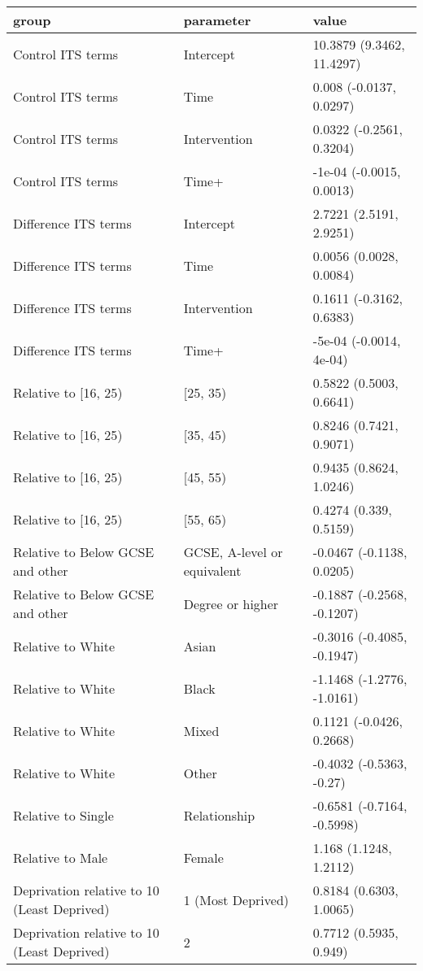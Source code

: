 \begin{table}[ht]
\centering
\begin{tabular}{lll}
  \hline
group & parameter & value \\ 
  \hline
Control ITS terms & Intercept & 10.3879 (9.3462, 11.4297) \\ 
  Control ITS terms & Time & 0.008 (-0.0137, 0.0297) \\ 
  Control ITS terms & Intervention & 0.0322 (-0.2561, 0.3204) \\ 
  Control ITS terms & Time+ & -1e-04 (-0.0015, 0.0013) \\ 
  Difference ITS terms & Intercept & 2.7221 (2.5191, 2.9251) \\ 
  Difference ITS terms & Time & 0.0056 (0.0028, 0.0084) \\ 
  Difference ITS terms & Intervention & 0.1611 (-0.3162, 0.6383) \\ 
  Difference ITS terms & Time+ & -5e-04 (-0.0014, 4e-04) \\ 
  Relative to [16, 25) & [25, 35) & 0.5822 (0.5003, 0.6641) \\ 
  Relative to [16, 25) & [35, 45) & 0.8246 (0.7421, 0.9071) \\ 
  Relative to [16, 25) & [45, 55) & 0.9435 (0.8624, 1.0246) \\ 
  Relative to [16, 25) & [55, 65) & 0.4274 (0.339, 0.5159) \\ 
  Relative to Below GCSE and other & GCSE, A-level or equivalent & -0.0467 (-0.1138, 0.0205) \\ 
  Relative to Below GCSE and other & Degree or higher & -0.1887 (-0.2568, -0.1207) \\ 
  Relative to White & Asian & -0.3016 (-0.4085, -0.1947) \\ 
  Relative to White & Black & -1.1468 (-1.2776, -1.0161) \\ 
  Relative to White & Mixed & 0.1121 (-0.0426, 0.2668) \\ 
  Relative to White & Other & -0.4032 (-0.5363, -0.27) \\ 
  Relative to Single & Relationship & -0.6581 (-0.7164, -0.5998) \\ 
  Relative to Male & Female & 1.168 (1.1248, 1.2112) \\ 
  Deprivation relative to 10 (Least Deprived) & 1 (Most Deprived) & 0.8184 (0.6303, 1.0065) \\ 
  Deprivation relative to 10 (Least Deprived) & 2 & 0.7712 (0.5935, 0.949) \\ 

\end{tabular}
\end{table}
